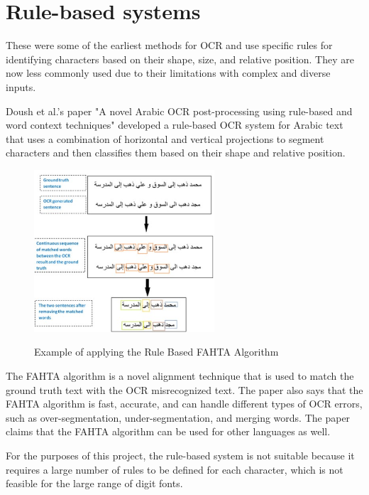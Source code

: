 \newpage

\section{Rule-based systems}

These were some of the earliest methods for OCR and use specific rules for identifying characters based on their shape, size, and relative position. They are now less commonly used due to their limitations with complex and diverse inputs.

Doush et al.'s paper "A novel Arabic OCR post-processing using rule-based and word context techniques" developed a rule-based OCR system for Arabic text that uses a combination of horizontal and vertical projections to segment characters and then classifies them based on their shape and relative position. \cite{doushNovelArabicOCR2018}



\begin{figure}[ht]
    \centering
    \includegraphics[width=0.6\textwidth]{Figures/RB_Doush.jpg}
    \caption[Example of applying the Rule Based FAHTA Algorithm]{Example of applying the Rule Based FAHTA Algorithm}\cite{doushNovelArabicOCR2018}
    \label{fig:Doush Rule Based OCR Paper}
\end{figure}

The FAHTA algorithm is a novel alignment technique that is used to match the ground truth text with the OCR misrecognized text. The paper also says that the FAHTA algorithm is fast, accurate, and can handle different types of OCR errors, such as over-segmentation, under-segmentation, and merging words. The paper claims that the FAHTA algorithm can be used for other languages as well.


For the purposes of this project, the rule-based system is not suitable because it requires a large number of rules to be defined for each character, which is not feasible for the large range of digit fonts.


